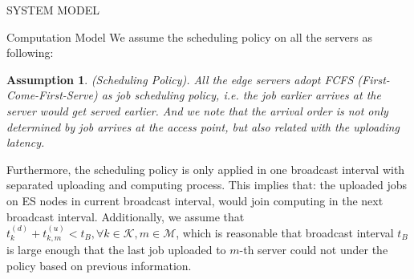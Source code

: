 \documentclass[10pt, conference, letterpaper]{IEEEtran}
\newtheorem{assumption}{Assumption}
\newcommand{\apSet}{\mathcal{K}}
\newcommand{\esSet}{\mathcal{M}}
\begin{document}
\begin{section}{SYSTEM MODEL}
\begin{subsection}{Computation Model}
            We assume the scheduling policy on all the servers as following:
            \begin{assumption}
                (Scheduling Policy).
                All the edge servers adopt \emph{FCFS} (First-Come-First-Serve) as job scheduling policy, i.e. the job earlier arrives at the server would get served earlier. And we note that the arrival order is not only determined by job arrives at the access point, but also related with the uploading latency.
            \end{assumption}
            Furthermore, the scheduling policy is only applied in one broadcast interval with separated uploading and computing process. This implies that: the uploaded jobs on ES nodes in current broadcast interval, would join computing in the next broadcast interval. Additionally, we assume that $t^{(d)}_k + t^{(u)}_{k,m} < t_B, \forall k\in\apSet,m\in\esSet$, which is reasonable that broadcast interval $t_B$ is large enough that the last job uploaded to $m$-th server could not under the policy based on previous information.
        \end{subsection}
    \end{section}
\end{document}
